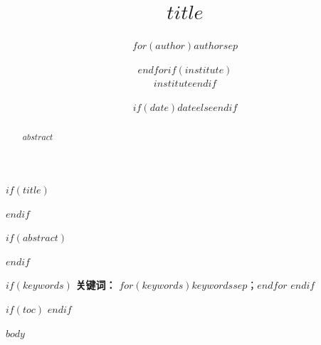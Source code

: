 \documentclass[
$if(fontsize)$
  $fontsize$,
$endif$
$if(papersize)$
  $papersize$paper,
$else$
  a4paper,
$endif$
$for(classoption)$
  $classoption$$sep$,
$endfor$
]{article}
\title{$title$}
\author{$for(author)$$author$$sep$ \and $endfor$$if(institute)$\\[4pt]{\normalsize\itshape $institute$}$endif$}
\date{$if(date)$$date$$else$$endif$}
\begin{document}
$if(title)$
\maketitle
$endif$

$if(abstract)$
\begin{abstract}
$abstract$
\end{abstract}
$endif$

$if(keywords)$
\noindent\textbf{关键词：} $for(keywords)$$keywords$$sep$；$endfor$
$endif$

$if(toc)$
\tableofcontents
\newpage
$endif$

$body$
\end{document}
